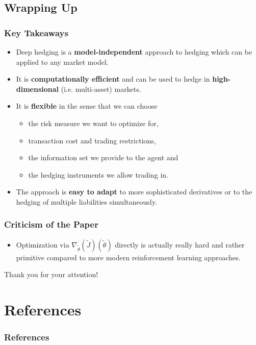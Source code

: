 \documentclass[serif]{beamer}
\begin{document}
\subsection{Wrapping Up}

\begin{frame}
    \frametitle{Key Takeaways}
    \begin{itemize}
        \item Deep hedging is a \textbf{model-independent} approach to hedging
              which can be applied to any market model.
        \item It is \textbf{computationally efficient} and can be used to
              hedge in \textbf{high-dimensional} (i.e. multi-asset) markets.
        \item It is \textbf{flexible} in the sense that we can choose
              \begin{itemize}
                  \item the risk measure we want to optimize for,
                  \item transaction cost and trading restrictions,
                  \item the information set we provide to the agent and
                  \item the hedging instruments we allow trading in.
              \end{itemize}
        \item The approach is \textbf{easy to adapt} to more sophisticated
              derivatives or to the hedging of multiple liabilities
              simultaneously.
    \end{itemize}
\end{frame}

\begin{frame}
    \frametitle{Criticism of the Paper}
    \begin{itemize}
        \item Optimization via
              $\nabla_{\tilde{\theta}} (\tilde{J}) (\tilde{\theta})$
              directly is actually really hard and rather primitive
              compared to more modern reinforcement learning approaches.
    \end{itemize}
\end{frame}

\begin{frame}
    \centering
    \Large{
        Thank you for your attention!
    }
\end{frame}

\section{References}
\begin{frame}
    \frametitle{References}
    
    
\end{frame}
\end{document}
